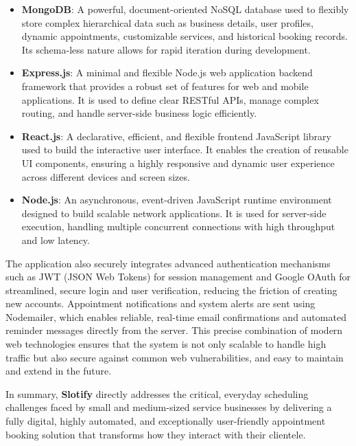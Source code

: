 \begin{itemize}
\item \textbf{MongoDB}: A powerful, document-oriented NoSQL database used to flexibly store complex hierarchical data such as business details, user profiles, dynamic appointments, customizable services, and historical booking records. Its schema-less nature allows for rapid iteration during development.
\item \textbf{Express.js}: A minimal and flexible Node.js web application backend framework that provides a robust set of features for web and mobile applications. It is used to define clear RESTful APIs, manage complex routing, and handle server-side business logic efficiently.
\item \textbf{React.js}: A declarative, efficient, and flexible frontend JavaScript library used to build the interactive user interface. It enables the creation of reusable UI components, ensuring a highly responsive and dynamic user experience across different devices and screen sizes.
\item \textbf{Node.js}: An asynchronous, event-driven JavaScript runtime environment designed to build scalable network applications. It is used for server-side execution, handling multiple concurrent connections with high throughput and low latency.
\end{itemize}

The application also securely integrates advanced authentication mechanisms such as JWT (JSON Web Tokens) for session management and Google OAuth for streamlined, secure login and user verification, reducing the friction of creating new accounts. Appointment notifications and system alerts are sent using Nodemailer, which enables reliable, real-time email confirmations and automated reminder messages directly from the server. This precise combination of modern web technologies ensures that the system is not only scalable to handle high traffic but also secure against common web vulnerabilities, and easy to maintain and extend in the future.

In summary, \textbf{Slotify} directly addresses the critical, everyday scheduling challenges faced by small and medium-sized service businesses by delivering a fully digital, highly automated, and exceptionally user-friendly appointment booking solution that transforms how they interact with their clientele.
